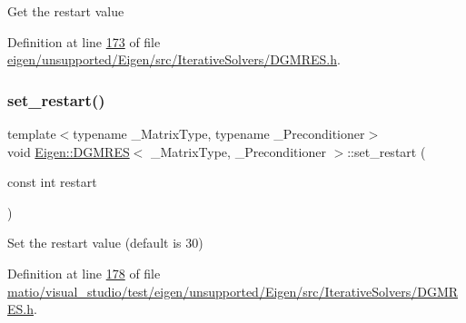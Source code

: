 Get the restart value 

Definition at line \hyperlink{eigen_2unsupported_2_eigen_2src_2_iterative_solvers_2_d_g_m_r_e_s_8h_source_l00173}{173} of file \hyperlink{eigen_2unsupported_2_eigen_2src_2_iterative_solvers_2_d_g_m_r_e_s_8h_source}{eigen/unsupported/\+Eigen/src/\+Iterative\+Solvers/\+D\+G\+M\+R\+E\+S.\+h}.

\mbox{\label{class_eigen_1_1_d_g_m_r_e_s_a2f99e7b3b04da0ecb6607630a82b4e56}} 
\subsubsection{\texorpdfstring{set\+\_\+restart()}{set\_restart()}\hspace{0.1cm}{\footnotesize\ttfamily [1/2]}}
{\footnotesize\ttfamily template$<$typename \+\_\+\+Matrix\+Type, typename \+\_\+\+Preconditioner$>$ \\
void \hyperlink{class_eigen_1_1_d_g_m_r_e_s}{Eigen\+::\+D\+G\+M\+R\+ES}$<$ \+\_\+\+Matrix\+Type, \+\_\+\+Preconditioner $>$\+::set\+\_\+restart (\begin{DoxyParamCaption}\item[{const int}]{restart }\end{DoxyParamCaption})\hspace{0.3cm}{\ttfamily [inline]}}

Set the restart value (default is 30) 

Definition at line \hyperlink{matio_2visual__studio_2test_2eigen_2unsupported_2_eigen_2src_2_iterative_solvers_2_d_g_m_r_e_s_8h_source_l00178}{178} of file \hyperlink{matio_2visual__studio_2test_2eigen_2unsupported_2_eigen_2src_2_iterative_solvers_2_d_g_m_r_e_s_8h_source}{matio/visual\+\_\+studio/test/eigen/unsupported/\+Eigen/src/\+Iterative\+Solvers/\+D\+G\+M\+R\+E\+S.\+h}.

\mbox{\label{class_eigen_1_1_d_g_m_r_e_s_a2f99e7b3b04da0ecb6607630a82b4e56}} 
